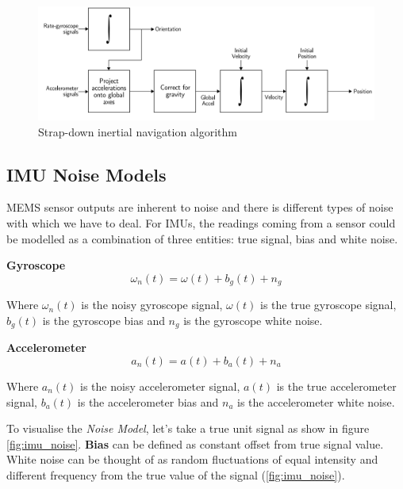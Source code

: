 \begin{figure}[H]
\includegraphics[scale=0.2]{images/fig_chapter2/strap_imu_algo.png}
\caption{Strap-down inertial navigation algorithm \citep{woodman2007introduction}}
\label{fig:strapdown_imu}
\end{figure}

\subsection{IMU Noise Models}
MEMS sensor outputs are inherent to noise and there is different types of noise with which we have to deal. For IMUs, the readings coming from a sensor could be modelled as a combination of three entities: true signal, bias and white noise.

\textbf{Gyroscope}
\begin{equation}
    \omega_{n}(t) = \omega(t) + b_{g}(t) + n_{g}
\label{eqn:gyro_noise}
\end{equation}

Where $ \omega_{n}(t) $ is the noisy gyroscope signal, $ \omega(t) $ is the true gyroscope signal, $ b_{g}(t) $ is the gyroscope bias and $ n_{g} $ is the gyroscope white noise.

\textbf{Accelerometer}
\begin{equation}
    a_{n}(t) = a(t) + b_{a}(t) + n_{a}
\label{eqn:accel_noise}
\end{equation}

Where $ a_{n}(t) $ is the noisy accelerometer signal, $ a(t) $ is the true accelerometer signal, $ b_{a}(t) $ is the accelerometer bias and $ n_{a} $ is the accelerometer white noise.


To visualise the \textit{Noise Model}, let's take a true unit signal as show in figure \ref{fig:imu_noise}. \textbf{Bias} can be defined as constant offset from true signal value. White noise can be thought of as random fluctuations of equal intensity and different frequency from the true value of the signal (\ref{fig:imu_noise}).

